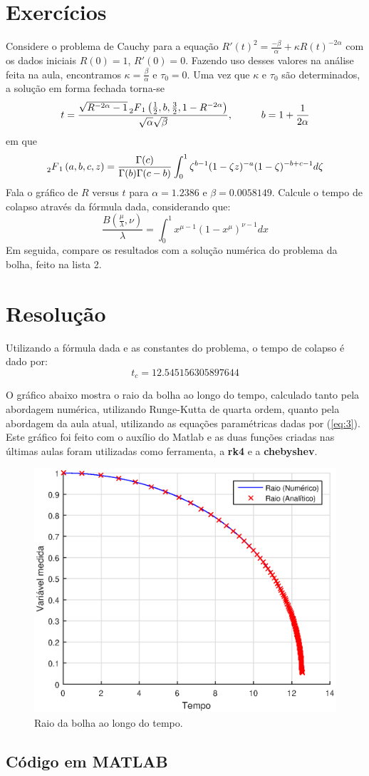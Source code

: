 \documentclass[10pt,a4paper]{article}
\begin{document}
    \section{Exercícios}
    Considere o problema de Cauchy para a equação $R'(t)^2 = \frac{-\beta}{\alpha} + \kappa R(t)^{-2\alpha}$ com os dados iniciais $R(0)=1$, $R'(0)=0$. Fazendo uso desses valores na análise feita na aula, encontramos $\kappa=\frac{\beta}{\alpha}$ e $\tau_0=0$. Uma vez que $\kappa$ e $\tau_0$ são determinados, a solução em forma fechada torna-se
    \[t=\frac{\sqrt{R^{-2\alpha}-1} \prescript{}{2}{F}_1\left(\frac{1}{2}, b, \frac{3}{2}, 1-R^{-2\alpha}\right)}{\sqrt{\alpha}\sqrt{\beta}}, \hspace{1cm} b=1+\frac{1}{2\alpha}\]
    em que
    \[\prescript{}{2}{F}_1\left(a,b,c,z\right) = \frac{\Gamma(c)}{\Gamma(b)\Gamma(c-b)}\int_0^1\zeta^{b-1}(1-\zeta z)^{-a}(1-\zeta)^{-b+c-1}d\zeta \]
    Fala o gráfico de $R$ versus $t$ para $\alpha=1.2386$ e $\beta=0.0058149$. Calcule o tempo de colapso através da fórmula dada, considerando que:
    \[\frac{B\left(\frac{\mu}{\lambda},\nu\right)}{\lambda} = \int_0^1 x^{\mu-1}\left(1-x^\mu\right)^{\nu-1}dx\]
    Em seguida, compare os resultados com a solução numérica do problema da bolha, feito na lista 2.
    
    \newpage
    \section{Resolução}
    Utilizando a fórmula dada e as constantes do problema, o tempo de colapso é dado por:
    \[t_c=\mathbf{12.545156305897644}\]
    
    O gráfico abaixo mostra o raio da bolha ao longo do tempo, calculado tanto pela abordagem numérica, utilizando Runge-Kutta de quarta ordem, quanto pela abordagem da aula atual, utilizando as equações paramétricas dadas por (\ref{eq:3}). Este gráfico foi feito com o auxílio do Matlab e as duas funções criadas nas últimas aulas foram utilizadas como ferramenta, a \textbf{rk4} e a \textbf{chebyshev}.
    
    \begin{figure}[h!]
    \centering
      \includegraphics[width=0.8\linewidth]{figures/numanl.eps}
      \caption{Raio da bolha ao longo do tempo.}
      \label{fig:raio}
	\end{figure}
    
    \newpage
    \subsection{Código em MATLAB}
    
    
    
\end{document}
